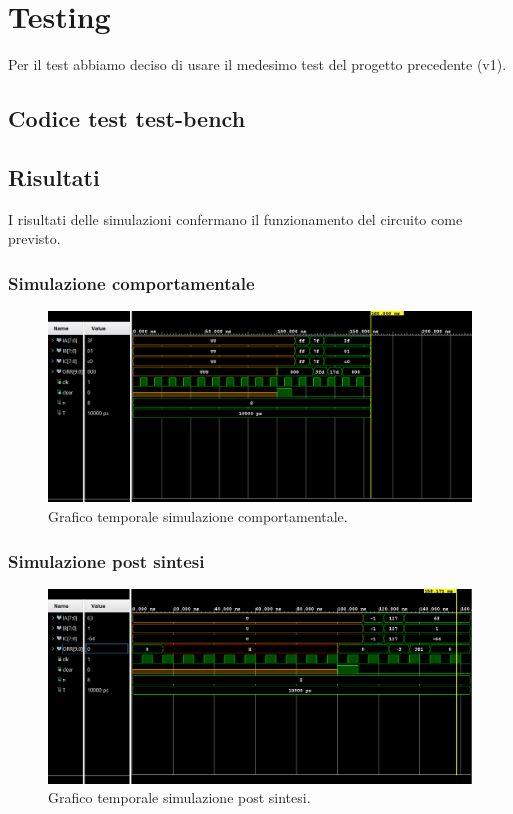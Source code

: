 \documentclass[12pt]{article}
\begin{document}
\section{Testing}
    Per il test abbiamo deciso di usare il medesimo test del progetto precedente (v1).

    \subsection{Codice test test-bench}
        

    \subsection{Risultati}
        I risultati delle simulazioni confermano il funzionamento del circuito come previsto.

        \subsubsection{Simulazione comportamentale}
            \begin{figure}[ht]
                \centering
                \includegraphics[scale=0.55]{Test_RTL.png}
                \caption{Grafico temporale simulazione comportamentale.}
            \end{figure}
            \newpage

        \subsubsection{Simulazione post sintesi}
            \begin{figure}[ht]
                \centering
                \includegraphics[scale=0.55]{Test_Sin.png}
                \caption{Grafico temporale simulazione post sintesi.}
            \end{figure}
            \newpage
\end{document}
